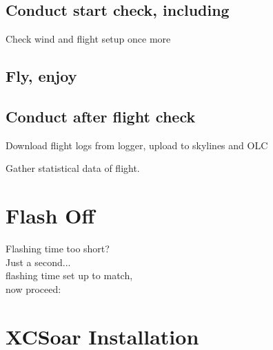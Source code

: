 \documentclass[english,a4paper,12pt]{refrep}
\begin{document}
\subsection*{\textcolor{flashblue}{Conduct start check, including}}
\begin{compactitem}
\item Check wind and flight setup once more
\end{compactitem}

\subsection*{\textcolor{flashblue}{Fly, enjoy}}

\subsection*{\textcolor{flashblue}{Conduct after flight check}}
\begin{compactitem}
\item Download flight logs from logger, upload to skylines and OLC
\item Gather statistical data of flight.
\end{compactitem}

\section*{{\color[rgb]{.9,.85,0}Flash} Off}

\vspace{2em}
\hspace*{1cm} Flashing time too short?\\
\hspace*{4cm} Just a second...\\
\hspace*{6cm} flashing time set up to match,\\
\hspace*{10cm} now proceed:


\setlength{\parskip}{0.3\baselineskip}
\newpage
\section{XCSoar Installation}\label{ch:XCSinstall}
\end{document}
